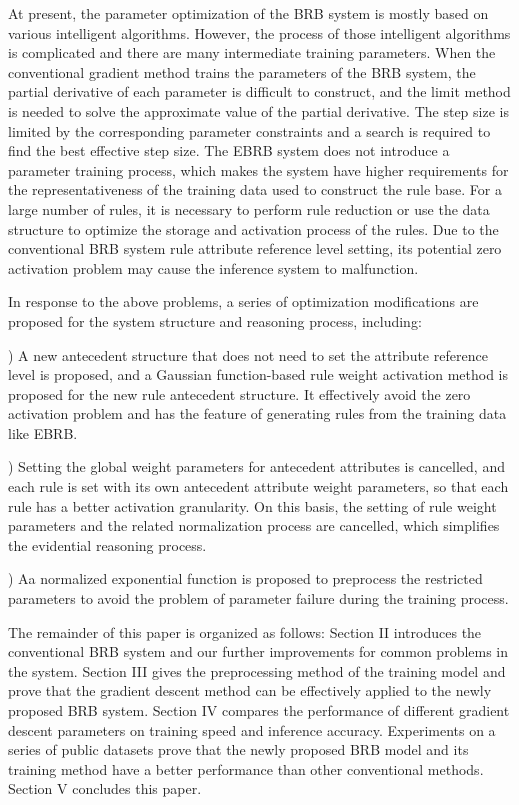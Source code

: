 \documentclass{ieeeaccess}
\begin{document}
At present, the parameter optimization of the BRB system is mostly based on various intelligent algorithms.
However, the process of those intelligent algorithms is complicated and there are many intermediate training parameters.
When the conventional gradient method trains the parameters of the BRB system, the partial derivative of each parameter is difficult to construct,
and the limit method is needed to solve the approximate value of the partial derivative\cite{a13}.
The step size is limited by the corresponding parameter constraints and a search is required to find the best effective step size\cite{a11,a12,a13}.
The EBRB system does not introduce a parameter training process, which makes the system have higher requirements for the representativeness of the training data used to construct the rule base.
For a large number of rules, it is necessary to perform rule reduction or use the data structure to optimize the storage and activation process of the rules.
Due to the conventional BRB system rule attribute reference level setting, its potential zero activation problem may cause the inference system to malfunction.

In response to the above problems, a series of optimization modifications are proposed for the system structure and reasoning process, including:

) A new antecedent structure that does not need to set the attribute reference level is proposed, and a Gaussian function-based
rule weight activation method is proposed for the new rule antecedent structure. It effectively avoid the zero activation problem and has the feature of
generating rules from the training data like EBRB.

) Setting the global weight parameters for antecedent attributes is cancelled,
and each rule is set with its own antecedent attribute weight parameters,
so that each rule has a better activation granularity.
On this basis, the setting of rule weight parameters and the related normalization process are cancelled,
which simplifies the evidential reasoning process.

) Aa normalized exponential function is proposed to preprocess the restricted parameters to
avoid the problem of parameter failure during the training process.

The remainder of this paper is organized as follows: Section II introduces the conventional BRB system and our further improvements for common problems in the system.
Section III gives the preprocessing method of the training model and prove that the gradient descent method can be effectively applied to the newly proposed BRB system.
Section IV compares the performance of different gradient descent parameters on training speed and inference accuracy. Experiments on a series of public datasets prove that
the newly proposed BRB model and its training method have a better performance than other conventional methods. Section V concludes this paper.
\end{document}
